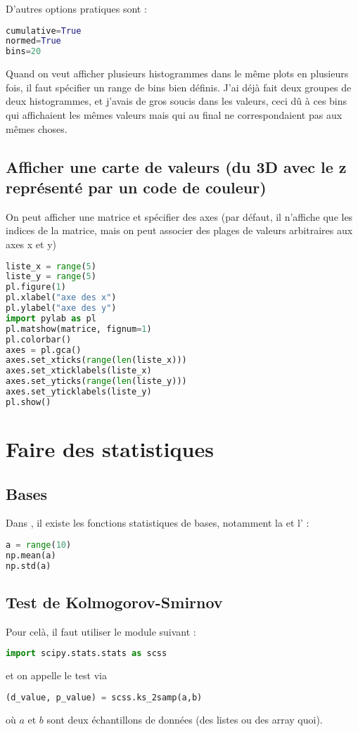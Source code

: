 \documentclass[a4paper,twoside]{article}
\begin{document}
D'autres options pratiques sont :
\begin{lstlisting}[language=python]
cumulative=True
normed=True
bins=20
\end{lstlisting}

\begin{attention}
Quand on veut afficher plusieurs histogrammes dans le même plots en plusieurs fois, il faut spécifier un range de bins bien définis. J'ai déjà fait deux groupes de deux histogrammes, et j'avais de gros soucis dans les valeurs, ceci dû à ces bins qui affichaient les mêmes valeurs mais qui au final ne correspondaient pas aux mêmes choses.
\end{attention}


\subsection{Afficher une carte de valeurs (du 3D avec le z représenté par un code de couleur)}
On peut afficher une matrice et spécifier des axes (par défaut, il n'affiche que les indices de la matrice, mais on peut associer des plages de valeurs arbitraires aux axes x et y)

\begin{lstlisting}[language=python]
liste_x = range(5)
liste_y = range(5)
pl.figure(1)
pl.xlabel("axe des x")
pl.ylabel("axe des y")
import pylab as pl
pl.matshow(matrice, fignum=1)
pl.colorbar()
axes = pl.gca()
axes.set_xticks(range(len(liste_x)))
axes.set_xticklabels(liste_x)
axes.set_yticks(range(len(liste_y)))
axes.set_yticklabels(liste_y)
pl.show()
\end{lstlisting}

\section{Faire des statistiques}
\subsection{Bases}
Dans , il existe les fonctions statistiques de bases, notamment la  et l' :
\begin{lstlisting}[language=python]
a = range(10)
np.mean(a)
np.std(a)
\end{lstlisting}



\subsection{Test de Kolmogorov-Smirnov}
Pour celà, il faut utiliser le module suivant :
\begin{lstlisting}[language=python]
import scipy.stats.stats as scss
\end{lstlisting}
et on appelle le test via
\begin{lstlisting}[language=python]
(d_value, p_value) = scss.ks_2samp(a,b)
\end{lstlisting}
où $a$ et $b$ sont deux échantillons de données (des listes ou des array quoi).
\end{document}
